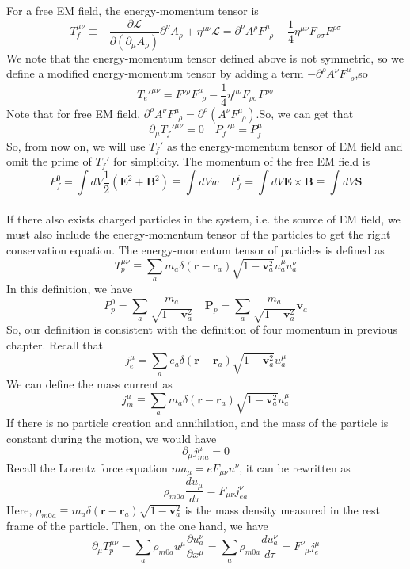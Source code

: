 \documentclass[cyan]{elegantnote}
\begin{document}
For a free EM field, the energy-momentum tensor is
\[T_f^{\mu \nu} \equiv -\frac{\partial \mathcal{L}}{\partial(\partial_{\mu}A_{\rho})} \partial^{\nu} A_{\rho} + \eta^{\mu \nu} \mathcal{L} = \partial^{\nu}A^{\rho} F^{\mu}_{\phantom{\rho}\rho}-\frac{1}{4}\eta^{\mu\nu}F_{\rho\sigma}F^{\rho\sigma}\]
We note that the energy-momentum tensor defined above is not symmetric, so we define a modified energy-momentum tensor by adding a term $-\partial^{\rho}A^{\nu}F^{\mu}_{\phantom{\rho}\rho}$,so
\[T_e'^{\mu\nu} = F^{\nu\rho}F^{\mu}_{\phantom{\rho}\rho}-\frac{1}{4}\eta^{\mu\nu}F_{\rho\sigma}F^{\rho\sigma}\]
Note that for free EM field, $\partial^{\rho}A^{\nu}F^{\mu}_{\phantom{\rho}\rho} = \partial^{\rho}\left(A^{\nu}F^{\mu}_{\phantom{\rho}\rho}\right)$.So,
we can get that
\[\partial_{\mu}T_f'^{\mu\nu} = 0 \quad P_f'^{\mu} = P_f^{\mu}\]
So, from now on, we will use $T_f'$ as the energy-momentum tensor of EM field and omit the prime of $T_f'$ for simplicity.
The momentum of the free EM field is
\[P_f^{0} = \int dV \frac{1}{2}(\bm{E}^2+\bm{B}^2) \equiv \int dV w \quad P_f^{i} = \int dV \bm{E} \times \bm{B} \equiv \int dV \bm{S}\]\\
If there also exists charged particles in the system, i.e. the source of EM field, we must also include the energy-momentum tensor of the particles to get the right conservation equation. The energy-momentum tensor of particles is defined as
\[T_p^{\mu\nu} \equiv \sum_a m_a \delta(\bm{r}-\bm{r}_a) \sqrt{1-\bm{v}_a^2} u_a^\mu u_a^{\nu}\]
In this definition, we have
\[P_p^0 = \sum_a \frac{m_a}{\sqrt{1-\bm{v}_a^2}} \quad \bm{P}_p =  \sum_a \frac{m_a}{\sqrt{1-\bm{v}_a^2}} \bm{v}_a\]
So, our definition is consistent with the definition of four momentum in previous chapter.
Recall that
\[j^{\mu}_e = \sum_a e_a \delta(\bm{r}-\bm{r}_a) \sqrt{1-\bm{v}_a^2} u_a^\mu \]
We can define the mass current as
\[j^{\mu}_m \equiv \sum_a m_a \delta(\bm{r}-\bm{r}_a) \sqrt{1-\bm{v}_a^2} u_a^\mu \]
If there is no particle creation and annihilation, and the mass of the particle is constant during the motion, we would have
\[\partial_{\mu} j^{\mu}_{ma} = 0\]
Recall the Lorentz force equation $m a_{\mu} = eF_{\mu\nu}u^{\nu}$, it can be rewritten as
\[\rho_{m0a} \frac{du_{\mu}}{d\tau} = F_{\mu\nu}j_{ea}^{\nu}\]
Here, $\rho_{m0a} \equiv m_a \delta(\bm{r}-\bm{r}_a) \sqrt{1-\bm{v}_a^2}$ is the mass density measured in the rest frame of the particle. Then, on the one hand, we have
\[\partial_{\mu} T_p^{\mu\nu} = \sum_a \rho_{m0a}u^{\mu} \frac{\partial u_a^{\nu}}{\partial x^{\mu}} = \sum_a \rho_{m0a} \frac{d u_a^{\nu}}{d \tau} = F^{\nu}_{\phantom{\nu}\mu}j_e^{\mu}\]
\end{document}
